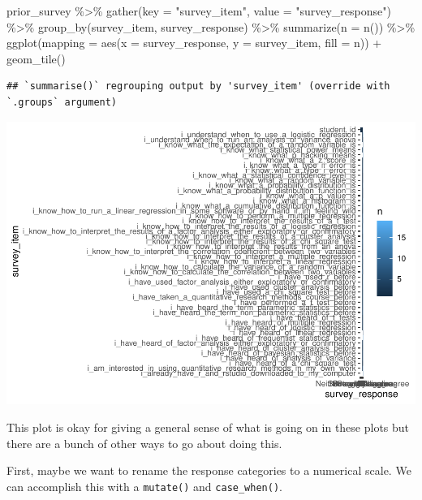 \documentclass[
]{book}
\newenvironment{Shaded}{\begin{snugshade}}{\end{snugshade}}
\newcommand{\AttributeTok}[1]{\textcolor[rgb]{0.77,0.63,0.00}{#1}}
\newcommand{\FunctionTok}[1]{\textcolor[rgb]{0.00,0.00,0.00}{#1}}
\newcommand{\NormalTok}[1]{#1}
\newcommand{\SpecialCharTok}[1]{\textcolor[rgb]{0.00,0.00,0.00}{#1}}
\newcommand{\StringTok}[1]{\textcolor[rgb]{0.31,0.60,0.02}{#1}}
\begin{document}
\begin{Shaded}
\begin{Highlighting}[]
\NormalTok{prior\_survey }\SpecialCharTok{\%\textgreater{}\%} 
  \FunctionTok{gather}\NormalTok{(}\AttributeTok{key =} \StringTok{"survey\_item"}\NormalTok{, }\AttributeTok{value =} \StringTok{"survey\_response"}\NormalTok{) }\SpecialCharTok{\%\textgreater{}\%} 
  \FunctionTok{group\_by}\NormalTok{(survey\_item, survey\_response) }\SpecialCharTok{\%\textgreater{}\%} 
  \FunctionTok{summarize}\NormalTok{(}\AttributeTok{n =} \FunctionTok{n}\NormalTok{()) }\SpecialCharTok{\%\textgreater{}\%} 
  \FunctionTok{ggplot}\NormalTok{(}\AttributeTok{mapping =} \FunctionTok{aes}\NormalTok{(}\AttributeTok{x =}\NormalTok{ survey\_response, }\AttributeTok{y =}\NormalTok{ survey\_item, }\AttributeTok{fill =}\NormalTok{ n)) }\SpecialCharTok{+}
  \FunctionTok{geom\_tile}\NormalTok{()}
\end{Highlighting}
\end{Shaded}

\begin{verbatim}
## `summarise()` regrouping output by 'survey_item' (override with `.groups` argument)
\end{verbatim}

\includegraphics{test_course_notes_files/figure-latex/unnamed-chunk-15-1.pdf}

This plot is okay for giving a general sense of what is going on in these plots but there are a bunch of other ways to go about doing this.

First, maybe we want to rename the response categories to a numerical scale. We can accomplish this with a \texttt{mutate()} and \texttt{case\_when()}.
\end{document}
